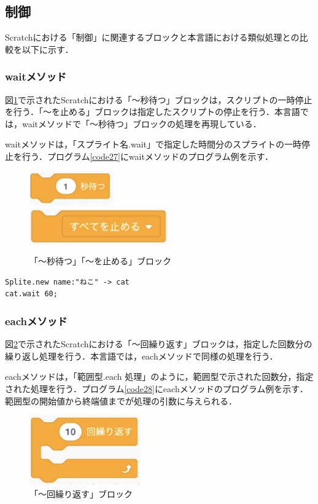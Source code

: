 \documentclass[10pt,a4j]{ltjsarticle}
\begin{document}
\subsection{制御}
Scratchにおける「制御」に関連するブロックと本言語における類似処理との比較を以下に示す．
\subsubsection{waitメソッド}
図\ref{fig:wait}で示されたScratchにおける「〜秒待つ」ブロックは，スクリプトの一時停止を行う．「〜を止める」ブロックは指定したスクリプトの停止を行う．本言語では，waitメソッドで「〜秒待つ」ブロックの処理を再現している．

waitメソッドは，「スプライト名.wait」で指定した時間分のスプライトの一時停止を行う．プログラム\ref{code27}にwaitメソッドのプログラム例を示す．

\begin{figure}[H]
  \centering
  \includegraphics[height=15mm]{images/wait.pdf} \\
  \includegraphics[height=15mm]{images/stop.pdf} 
  \caption{「〜秒待つ」「〜を止める」ブロック}
  \label{fig:wait}
\end{figure}

\begin{lstlisting}[caption=waitメソッドのプログラム例, label=code27]
Splite.new name:"ねこ" -> cat
cat.wait 60;
\end{lstlisting}

\subsubsection{eachメソッド}
図\ref{fig:each}で示されたScratchにおける「〜回繰り返す」ブロックは，指定した回数分の繰り返し処理を行う．本言語では，eachメソッドで同様の処理を行う．

eachメソッドは，「範囲型.each 処理」のように，範囲型で示された回数分，指定された処理を行う．プログラム\ref{code28}にeachメソッドのプログラム例を示す．範囲型の開始値から終端値までが処理の引数に与えられる．

\begin{figure}[H]
  \centering
  \includegraphics[height=30mm]{images/each.pdf} 
  \caption{「〜回繰り返す」ブロック}
  \label{fig:each}
\end{figure}
\end{document}
